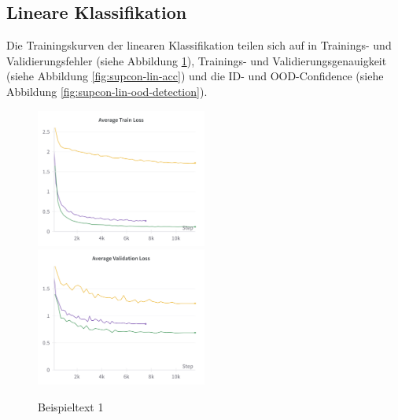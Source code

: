 
\subsection{Lineare Klassifikation} \label{sec:supcon-lin-results}

Die Trainingskurven der linearen Klassifikation teilen sich auf in Trainings- und Validierungsfehler (siehe Abbildung \ref{fig:supcon-lin-loss}), Trainings- und Validierungsgenauigkeit (siehe Abbildung \ref{fig:supcon-lin-acc}) und die ID- und OOD-Confidence (siehe Abbildung \ref{fig:supcon-lin-ood-detection}).

\begin{figure}[h]
	\centering
	\includegraphics[width=0.5\textwidth]{figure_results_supcon-lin_avg-train-loss.png}%
	\includegraphics[width=0.5\textwidth]{figure_results_supcon-lin_avg-val-loss.png}
	\caption{Beispieltext 1}
	\label{fig:supcon-lin-loss}
\end{figure}
